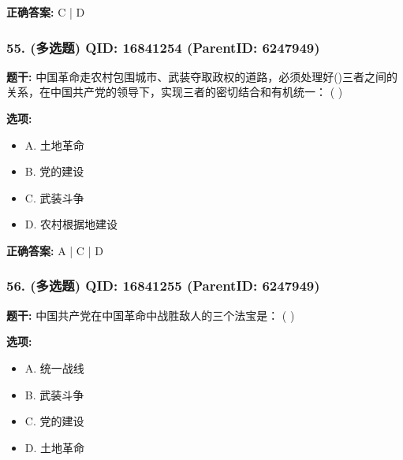 \documentclass[12pt,UTF8]{ctexart}
\begin{document}
\textbf{正确答案:}
C | D

\vspace{0.3em}\hrulefill\vspace{0.7em}

\subsubsection*{55. (多选题) \small QID: 16841254 (ParentID: 6247949)}

\textbf{题干:}
中国革命走农村包围城市、武装夺取政权的道路，必须处理好()三者之间的关系，在中国共产党的领导下，实现三者的密切结合和有机统一： ( )



\textbf{选项:}
\begin{itemize}[leftmargin=*]

  \item A. 土地革命

  \item B. 党的建设

  \item C. 武装斗争

  \item D. 农村根据地建设

\end{itemize}

\textbf{正确答案:}
A | C | D

\vspace{0.3em}\hrulefill\vspace{0.7em}

\subsubsection*{56. (多选题) \small QID: 16841255 (ParentID: 6247949)}

\textbf{题干:}
中国共产党在中国革命中战胜敌人的三个法宝是： ( )



\textbf{选项:}
\begin{itemize}[leftmargin=*]

  \item A. 统一战线

  \item B. 武装斗争

  \item C. 党的建设

  \item D. 土地革命

\end{itemize}
\end{document}
